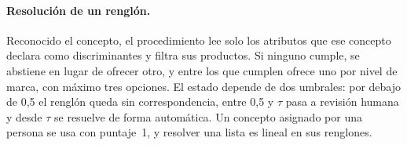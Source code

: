 \begin{algorithm}[H]
\caption{Puntaje híbrido léxico-semántico de un renglón frente a los conceptos del catálogo.}
\label{alg:anexo-clasificar}
\small
{}
\end{algorithm}

\paragraph{Resolución de un renglón.}
Reconocido el concepto, el procedimiento lee solo los atributos que ese concepto declara como
discriminantes y filtra sus productos. Si ninguno cumple, se abstiene en lugar de ofrecer otro, y
entre los que cumplen ofrece uno por nivel de marca, con máximo tres opciones. El estado depende de
dos umbrales: por debajo de 0,5 el renglón queda sin correspondencia, entre 0,5 y $\tau$ pasa a
revisión humana y desde $\tau$ se resuelve de forma automática. Un concepto asignado por una persona
se usa con puntaje~1, y resolver una lista es lineal en sus renglones.

